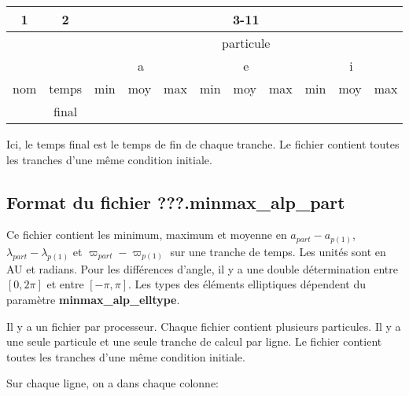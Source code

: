 \documentclass[11pt]{article}
\begin{document}
\begin{tabular}{|c|c|c|c|c|c|c|c|c|c|c|} \hline
 1 &    2 &  \multicolumn{9}{c|}{3-11}  \\ \hline
  &    &  \multicolumn{9}{c|}{particule}  \\ \hline
  &    &  \multicolumn{3}{c|}{a} & \multicolumn{3}{c|}{e} & \multicolumn{3}{c|}{i} \\ \hline
nom & temps &  min   &moy & max  &  min   & moy & max   & min   & moy & max \\  
 & final &     & &   &     &  &    &    &  &  
\\\hline
\end{tabular}

 Ici, le temps final est le temps de fin de chaque tranche. Le fichier contient toutes les tranches d'une m\^eme  condition initiale.

\subsection{Format du fichier {\bf ???.minmax\_alp\_part} }

Ce fichier contient les minimum, maximum et moyenne en $a_{part}-a_{p(1)}$, $\lambda_{part}-\lambda_{p(1)}$ et $\varpi_{part}-\varpi_{p(1)}$ sur une tranche de temps. Les unit\'es sont en AU et radians. Pour les diff\'erences d'angle, il y a une double d\'etermination entre $[0,2\pi]$ et entre $[-\pi, \pi]$.
Les types des \'el\'ements elliptiques d\'ependent du param\`etre  {\bf minmax\_alp\_elltype}.

 Il y a un fichier par processeur. Chaque fichier contient plusieurs particules.  Il y a une seule particule et une seule tranche de calcul  par ligne. Le fichier contient toutes les tranches d'une m\^eme  condition initiale.

Sur chaque ligne, on a dans chaque colonne: 
\end{document}
